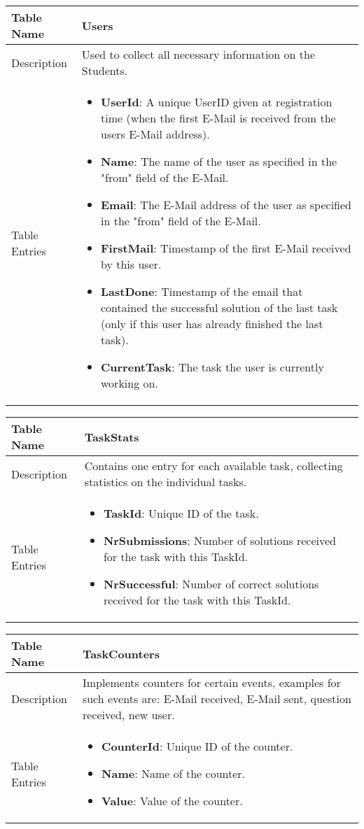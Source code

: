 \begin{tabular}{|p{3cm}|p{10cm}|}
\hline
Table Name & Users \\
\hline
Description & Used to collect all necessary information on the Students.\\
\hline
Table Entries & \begin{itemize}
        \item {\bf UserId}: A unique UserID given at registration time (when the first E-Mail
            is received from the users E-Mail address).
        \item {\bf Name}: The name of the user as specified in the "from" field of the E-Mail.
        \item {\bf Email}: The E-Mail address of the user as specified in the "from" field of the
            E-Mail.
        \item {\bf FirstMail}: Timestamp of the first E-Mail received by this user.
        \item {\bf LastDone}: Timestamp of the email that contained the successful solution of the
            last task (only if this user has already finished the last task).
        \item {\bf CurrentTask}: The task the user is currently working on.
        \end{itemize} \\
\hline
\end{tabular}

\begin{tabular}{|p{3cm}|p{10cm}|}
\hline
Table Name & TaskStats \\
\hline
Description & Contains one entry for each available task, collecting statistics on the individual tasks.\\
\hline
Table Entries & \begin{itemize}
        \item {\bf TaskId}: Unique ID of the task.
        \item {\bf NrSubmissions}: Number of solutions received for the task with this TaskId.
        \item {\bf NrSuccessful}: Number of correct solutions received for the task with this TaskId.
        \end{itemize} \\
\hline
\end{tabular}

\begin{tabular}{|p{3cm}|p{10cm}|}
\hline
Table Name & TaskCounters \\
\hline
Description & Implements counters for certain events, examples for such events are: E-Mail received, E-Mail sent, 
question received, new user.\\
\hline
Table Entries & \begin{itemize}
        \item {\bf CounterId}: Unique ID of the counter.
        \item {\bf Name}: Name of the counter.
        \item {\bf Value}: Value of the counter.
        \end{itemize} \\
\hline
\end{tabular}

